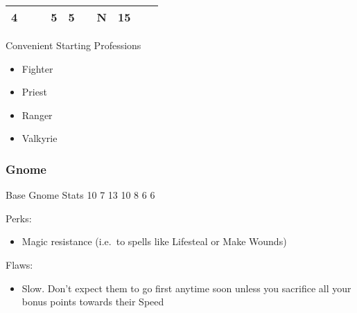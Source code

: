 \documentclass[12pt]{article}
\providecommand{\tightlist}{%
  \setlength{\itemsep}{0pt}\setlength{\parskip}{0pt}}
\newcommand{\WviiTwoColumnSetup}{\raggedcolumns\RaggedRight}
\begin{document}
\begin{longtable}[]{@{}llllllllll@{}}
\begin{minipage}[t]{0.06\columnwidth}
4
\strut\end{minipage} &
\begin{minipage}[t]{0.06\columnwidth}\raggedright\strut
\strut\end{minipage} &
\begin{minipage}[t]{0.06\columnwidth}\raggedright\strut
\strut\end{minipage} &
\begin{minipage}[t]{0.06\columnwidth}\raggedright\strut
5
\strut\end{minipage} &
\begin{minipage}[t]{0.06\columnwidth}\raggedright\strut
5
\strut\end{minipage} &
\begin{minipage}[t]{0.06\columnwidth}\raggedright\strut
\strut\end{minipage} &
\begin{minipage}[t]{0.07\columnwidth}\raggedright\strut
N
\strut\end{minipage} &
\begin{minipage}[t]{0.08\columnwidth}\raggedright\strut
15
\strut\end{minipage}\tabularnewline
\bottomrule
\end{longtable}

Convenient Starting Professions

\begin{multicols}{2}\WviiTwoColumnSetup
\begin{itemize}
\item
  Fighter
\item
  Priest
\item
  Ranger
\item
  Valkyrie
\end{itemize}
\end{multicols}

\subsubsection{Gnome}\label{gnome}

Base Gnome Stats 10 7 13 10 8 6 6

\begin{multicols}{2}\WviiTwoColumnSetup
Perks:

\begin{itemize}
\tightlist
\item
  Magic resistance (i.e.~to spells like Lifesteal or Make Wounds)
\end{itemize}
\columnbreak

Flaws:

\begin{itemize}
\tightlist
\item
  Slow. Don't expect them to go first anytime soon unless you sacrifice
  all your bonus points towards their Speed
\end{itemize}
\end{multicols}
\end{document}
